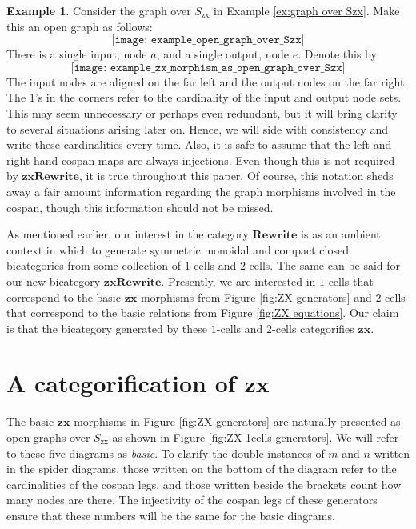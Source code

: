 \documentclass[11pt]{amsart}
\newcommand{\cat}[1]{\mathbf{#1}}
\theoremstyle{remark}
\theoremstyle{definition}
\newtheorem{ex}[thm]{Example}
\begin{document}
\begin{ex}
\label{ex:open graph over Szx}
Consider the graph over $S_{\text{zx}}$ in Example \ref{ex:graph over Szx}.  Make this an open graph as follows:
\[
	\texttt{[image: example\_open\_graph\_over\_Szx]}
\]
There is a single input, node $a$, and a single output, node $e$. Denote this by
\[
\texttt{[image: example\_zx\_morphism\_as\_open\_graph\_over\_Szx]}
\]
The input nodes are aligned on the far left and the output nodes on the far right.  The $1$'s in the corners refer to the cardinality of the input and output node sets.  This may seem unnecessary or perhaps even redundant, but it will bring clarity to several situations arising later on. Hence, we will side with consistency and write these cardinalities every time.  Also, it is safe to assume that the left and right hand cospan maps are always injections. Even though this is not required by $\cat{zxRewrite}$, it is true throughout this paper.  Of course, this notation sheds away a fair amount information regarding the graph morphisms involved in the cospan, though this information should not be missed.
\end{ex}

As mentioned earlier, our interest in the category $\cat{Rewrite}$ is as an ambient context in which to generate symmetric monoidal and compact closed bicategories from some collection of $1$-cells and $2$-cells. The same can be said for our new bicategory $\cat{zxRewrite}$.  Presently, we are interested in $1$-cells that correspond to the basic $\cat{zx}$-morphisms from Figure \ref{fig:ZX generators} and $2$-cells that correspond to the basic relations from Figure \ref{fig:ZX equations}.  Our claim is that the bicategory generated by these $1$-cells and $2$-cells categorifies $\cat{zx}$.

\section{A categorification of $\cat{zx}$}
\label{sec:zx categorified}

The basic $\cat{zx}$-morphisms in Figure \ref{fig:ZX generators} are naturally presented as open graphs over $S_{\text{zx}}$ as shown in Figure \ref{fig:ZX 1cells generators}.  We will refer to these five diagrams as \emph{basic}.  To clarify the double instances of $m$ and $n$ written in the spider diagrams, those written on the bottom of the diagram refer to the cardinalities of the cospan legs, and those written beside the brackets count how many nodes are there.  The injectivity of the cospan legs of these generators ensure that these numbers will be the same for the basic diagrams.
\end{document}
